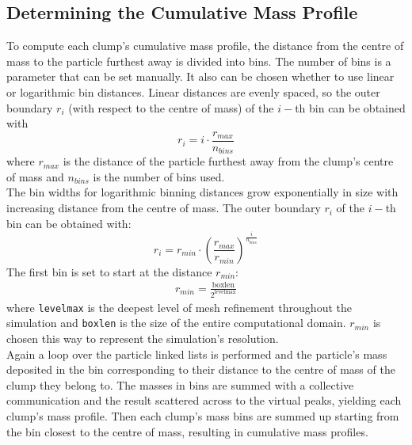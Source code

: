 \subsection{Determining the Cumulative Mass Profile}

To compute each clump's cumulative mass profile, the distance from the centre of mass to the particle furthest away is divided into bins.
The number of bins is a parameter that can be set manually.
It also can be chosen whether to use linear or logarithmic bin distances.
Linear distances are evenly spaced, so the outer boundary $r_i$ (with respect to the centre of mass) of the 
$i-$th bin can be obtained with
%
\begin{equation}
	r_i = i \cdot \frac{r_{max}}{n_{bins}}
\end{equation}
%
where $r_{max}$ is the distance of the particle furthest away from the clump's centre of mass and $n_{bins}$ is the number of bins used.\\
The bin widths for logarithmic binning distances grow exponentially in size with increasing distance from the centre of mass. %
The outer boundary $r_i$ of the $i-$th bin can be obtained with:
%
\begin{equation}
r_i = r_{min}  \cdot \left(\frac{r_{max}}{r_{min}} \right) ^{\frac{i}{n_{bins}}}
\end{equation}
%
The first bin is set to start at the distance $r_{min}$:
\begin{align}
	r_{min} = \frac{\text{boxlen}}{2^{\text{levelmax}}}
\end{align}
where \texttt{levelmax} is the deepest level of mesh refinement throughout the simulation and \texttt{boxlen} is the size of the entire computational domain.
$r_{min}$ is chosen this way to represent the simulation's resolution.\\
Again a loop over the particle linked lists is performed and the particle's mass deposited in the bin corresponding to their distance to the centre of mass of the clump they belong to.
The masses in bins are summed with a collective communication and the result scattered across to the virtual peaks, yielding each clump's mass profile.
Then each clump's mass bins are summed up starting from the bin closest to the centre of mass, resulting in cumulative mass profiles.

